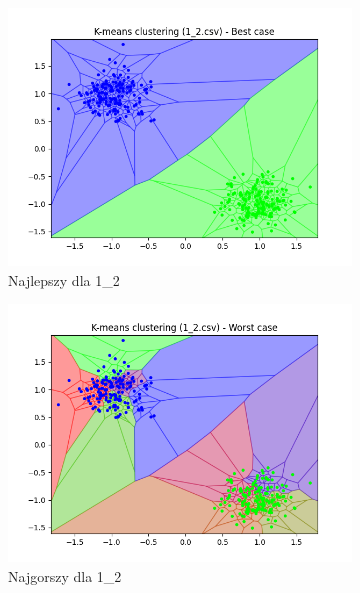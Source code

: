 \documentclass[12pt]{article}
\begin{document}
\begin{figure}[H]
\begin{subfigure}[b]{0.24\textwidth}
        \includegraphics[width=\linewidth]{img/exp_2/kmeans/1_2_best.png}
        \caption{Najlepszy dla 1\_2}
    \end{subfigure}
    \hfill
    \begin{subfigure}[b]{0.24\textwidth}
        \includegraphics[width=\linewidth]{img/exp_2/kmeans/1_2_worst.png}
        \caption{Najgorszy dla 1\_2}
    \end{subfigure}
    \begin{subfigure}[b]{0.24\textwidth}

\end{subfigure}
\end{figure}
\end{document}
